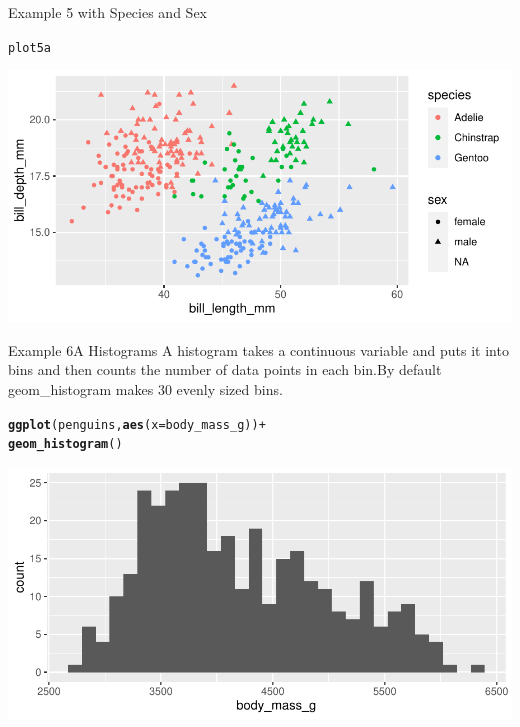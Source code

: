\documentclass{beamer}\usepackage[]{graphicx}\usepackage[]{xcolor}
\makeatletter
\newcommand{\hlopt}[1]{\textcolor[rgb]{0,0,0}{#1}}%
\newcommand{\hlstd}[1]{\textcolor[rgb]{0.345,0.345,0.345}{#1}}%
\newcommand{\hlkwc}[1]{\textcolor[rgb]{0.333,0.667,0.333}{#1}}%
\newcommand{\hlkwd}[1]{\textcolor[rgb]{0.737,0.353,0.396}{\textbf{#1}}}%
\newenvironment{kframe}{%
 \def\at@end@of@kframe{}%
 \ifinner\ifhmode%
  \def\at@end@of@kframe{\end{minipage}}%
  \begin{minipage}{\columnwidth}%
 \fi\fi%
 \def\FrameCommand##1{\hskip\@totalleftmargin \hskip-\fboxsep
 \colorbox{shadecolor}{##1}\hskip-\fboxsep
     \hskip-\linewidth \hskip-\@totalleftmargin \hskip\columnwidth}%
 \MakeFramed {\advance\hsize-\width
   \@totalleftmargin\z@ \linewidth\hsize
   \@setminipage}}%
 {\par\unskip\endMakeFramed%
 \at@end@of@kframe}
\newenvironment{knitrout}{}{} %
\makeatother
\begin{document}
\begin{frame}[fragile]{Example 5 with Species and Sex}
\begin{knitrout}
\color{fgcolor}\begin{kframe}
\begin{alltt}
\hlstd{plot5a}
\end{alltt}
\end{kframe}
\includegraphics[width=0.95\linewidth]{figure/unnamed-chunk-29-1} 
\end{knitrout}

\end{frame}

\begin{frame}[fragile]{Example 6A Histograms}
A histogram takes a continuous variable and puts it into bins and then counts the number of data points in each bin.By default geom\_histogram makes 30 evenly sized bins.
\begin{knitrout}
\color{fgcolor}\begin{kframe}
\begin{alltt}
\hlkwd{ggplot}\hlstd{(penguins,} \hlkwd{aes}\hlstd{(}\hlkwc{x} \hlstd{= body_mass_g))} \hlopt{+}
    \hlkwd{geom_histogram}\hlstd{()}
\end{alltt}
\end{kframe}
\includegraphics[width=0.95\linewidth]{figure/unnamed-chunk-30-1} 
\end{knitrout}


\end{frame}
\end{document}

